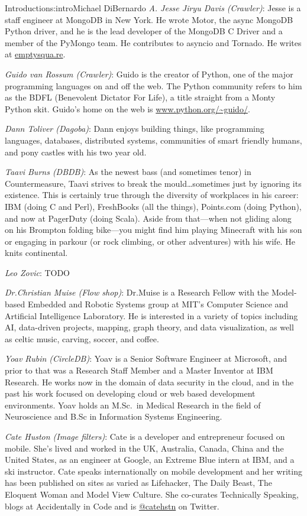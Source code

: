 \begin{aosachapter}{Introduction}{s:intro}{Michael DiBernardo}
\emph{A. Jesse Jiryu Davis (Crawler)}: Jesse is a staff engineer at MongoDB in New York. He wrote Motor, the async MongoDB Python driver, and he is the lead developer of the MongoDB C Driver and a member of the PyMongo team. He contributes to asyncio and Tornado. He writes at \url{emptysqua.re}.

\emph{Guido van Rossum (Crawler)}: Guido is the creator of Python, one of the major programming languages on and off the web. The Python community refers to him as the BDFL (Benevolent Dictator For Life), a title straight from a Monty Python skit.  Guido's home on the web is \url{www.python.org/~guido/}.

\emph{Dann Toliver (Dagoba)}: Dann enjoys building things, like programming languages, databases, distributed systems, communities of smart friendly humans, and pony castles with his two year old.

\emph{Taavi Burns (DBDB)}: As the newest bass (and sometimes tenor) in Countermeasure, Taavi strives to break the mould\ldots sometimes just by ignoring its existence. This is certainly true through the diversity of workplaces in his career: IBM (doing C and Perl), FreshBooks (all the things), Points.com (doing Python), and now at PagerDuty (doing Scala).  Aside from that—when not gliding along on his Brompton folding bike—you might find him playing Minecraft with his son or engaging in parkour (or rock climbing, or other adventures) with his wife. He knits continental.

\emph{Leo Zovic}: TODO

\emph{Dr.\@ Christian Muise (Flow shop)}: Dr.\@ Muise is a Research Fellow with the Model-based Embedded and Robotic Systems group at MIT's Computer Science and Artificial Intelligence Laboratory. He is interested in a variety of topics including AI, data-driven projects, mapping, graph theory, and data visualization, as well as celtic music, carving, soccer, and coffee.

\emph{Yoav Rubin (CircleDB)}: Yoav is a Senior Software Engineer at Microsoft, and prior to that was a Research Staff Member and a Master Inventor at IBM Research. He works now in the domain of data security in the cloud, and in the past his work focused on developing cloud or web based development environments. Yoav holds an M.Sc.\ in Medical Research in the field of Neuroscience and B.Sc in Information Systems Engineering. 

\emph{Cate Huston (Image filters)}: Cate is a developer and entrepreneur focused on mobile. She’s lived and worked in the UK, Australia, Canada, China and the United States, as an engineer at Google, an Extreme Blue intern at IBM, and a ski instructor. Cate speaks internationally on mobile development and her writing has been published on sites as varied as Lifehacker, The Daily Beast, The Eloquent Woman and Model View Culture. She co-curates Technically Speaking, blogs at Accidentally in Code and is \url{@catehstn} on Twitter.


\end{aosachapter}
